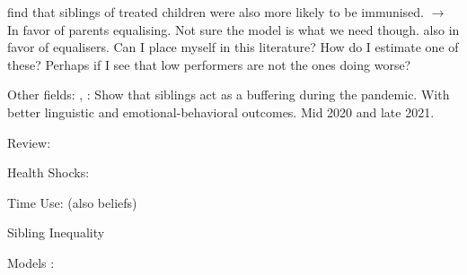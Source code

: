 \cite{adhvaryu_endowments_2016} find that siblings of treated children were also more likely to be immunised. $\rightarrow$ In favor of parents equalising. Not sure the model is what we need though. \cite{yi_early_2015} also in favor of equalisers. Can I place myself in this literature? How do I estimate one of these? Perhaps if I see that low performers are not the ones doing worse?

Other fields: \cite{hughes_siblings_2023}, \cite{lampis_long-lasting_2023}: Show that siblings act as a buffering during the pandemic. With better linguistic and emotional-behavioral outcomes. Mid 2020 and late 2021. 

Review: 
\cite{behrman_chapter_1997}
\cite{behrman_parental_2022} 
\cite{attanasio_early_2022}

Health Shocks:
\cite{bharadwaj_health_2018}
\cite{yi_early_2015}

Time Use: 
\cite{conti_parental_2022} (also beliefs)

Sibling Inequality
\cite{giannola_parental_2024}

Models
\cite{cunha_technology_2007}
\cite{rosenzweig_heterogeneity_1988}
\cite{behrman_parental_1982}: 






